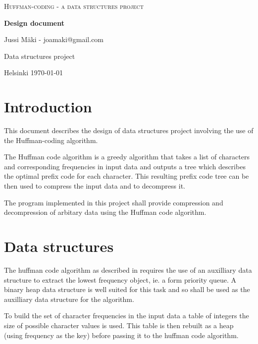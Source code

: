 \documentclass[11pt,a4paper]{article}
\begin{document}
\begin{titlepage}
  \begin{center} \sloppy
    \large \textsc{Huffman-coding - a data structures project}
    \vfill

    \huge \textbf{Design document} \vfill

    \LARGE Jussi Mäki - joamaki@gmail.com
    \vspace{3mm}

    Data structures project\\

    \vfill

    Helsinki \today

  \end{center}
\end{titlepage}

\section {Introduction}

This document describes the design of data structures project
involving the use of the Huffman-coding algorithm.

The Huffman code algorithm is a greedy algorithm that takes a list of
characters and corresponding frequencies in input data and outputs a
tree which describes the optimal prefix code for each character. This
resulting prefix code tree can be then used to compress the input data
and to decompress it.

The program implemented in this project shall provide
compression and decompression of arbitary data using
the Huffman code algorithm.

\section {Data structures}

The huffman code algorithm as described in \cite{CLRS} requires the
use of an auxilliary data structure to extract the lowest frequency
object, ie. a form priority queue. A binary heap data structure is
well suited for this task and so shall be used as the auxilliary data
structure for the algorithm.

To build the set of character frequencies in the input data a table of
integers the size of possible character values is used.  This table is
then rebuilt as a heap (using frequency as the key) before passing it
to the huffman code algorithm.
\end{document}
